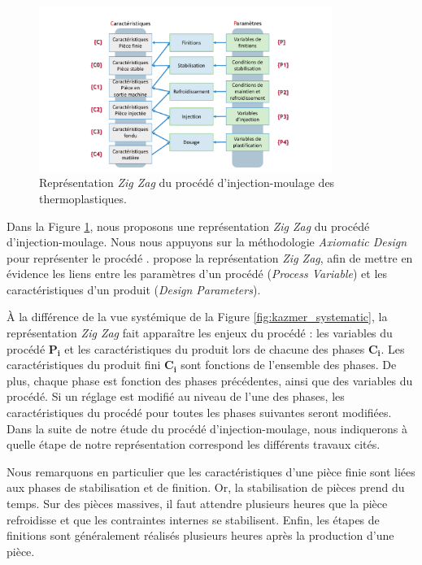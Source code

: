 \begin{figure}[hbtp]
	\centering
	\includegraphics[width=0.85\textwidth,height=\textheight,keepaspectratio]{../Chap1/Figures/Sapristi_ZigZag.pdf}
	\caption{Représentation \textit{Zig Zag} du procédé d'injection-moulage des thermoplastiques.}
	\label{fig:zigzag}
\end{figure}

Dans la Figure \ref{fig:zigzag}, nous proposons une représentation \textit{Zig Zag} du procédé d'injection-moulage.
Nous nous appuyons sur la méthodologie \textit{Axiomatic Design} pour représenter le procédé \cite{suh_principles_1990}.
\citeauthor{suh_principles_1990} propose la représentation \textit{Zig Zag}, afin de mettre en évidence les liens entre les paramètres d'un procédé (\textit{Process Variable}) et les caractéristiques d'un produit (\textit{Design Parameters}).

À la différence de la vue systémique de la Figure \ref{fig:kazmer_systematic}, la représentation \textit{Zig Zag} fait apparaître les enjeux du procédé : les variables du procédé $\boldsymbol{P_i}$ et les caractéristiques du produit lors de chacune des phases $\boldsymbol{C_i}$.
Les caractéristiques du produit fini $\boldsymbol{C_i}$ sont fonctions de l’ensemble des phases.
De plus, chaque phase est fonction des phases précédentes, ainsi que des variables du procédé.
Si un réglage est modifié au niveau de l’une des phases, les caractéristiques du procédé pour toutes les phases suivantes seront modifiées.
Dans la suite de notre étude du procédé d'injection-moulage, nous indiquerons à quelle étape de notre représentation correspond les différents travaux cités.

Nous remarquons en particulier que les caractéristiques d'une pièce finie sont liées aux phases de stabilisation et de finition.
Or, la stabilisation de pièces prend du temps.
Sur des pièces massives, il faut attendre plusieurs heures que la pièce refroidisse et que les contraintes internes se stabilisent.
Enfin, les étapes de finitions sont généralement réalisés plusieurs heures après la production d'une pièce.

